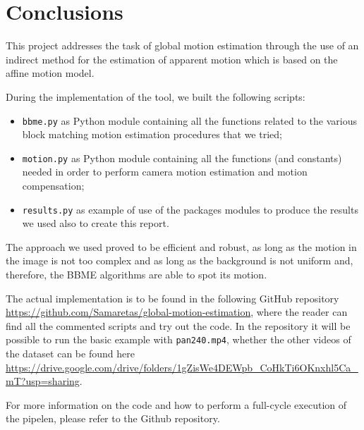 \section{Conclusions}
\label{sec:conclusions}

This project addresses the task of global motion estimation through the use of an indirect method for the estimation of apparent motion which is based on the affine motion model.

During the implementation of the tool, we built the following scripts:
\begin{itemize}
    \item \texttt{bbme.py} as Python module containing all the functions related to the various block matching motion estimation procedures that we tried;
    \item \texttt{motion.py} as Python module containing all the functions (and constants) needed in order to perform camera motion estimation and motion compensation;
    \item \texttt{results.py} as example of use of the packages modules to produce the results we used also to create this report.  
\end{itemize}

The approach we used proved to be efficient and robust, as long as the motion in the image is not too complex and as long as the background is not uniform and, therefore, the BBME algorithms are able to spot its motion.

The actual implementation is to be found in the following GitHub repository \url{https://github.com/Samaretas/global-motion-estimation}, where the reader can find all the commented scripts and try out the code.
In the repository it will be possible to run the basic example with \texttt{pan240.mp4}, whether the other videos of the dataset can be found here \url{https://drive.google.com/drive/folders/1gZisWe4DEWpb_CoHkTi6OKnxhl5Ca_mT?usp=sharing}.

For more information on the code and how to perform a full-cycle execution of the pipelen, please refer to the Github repository.